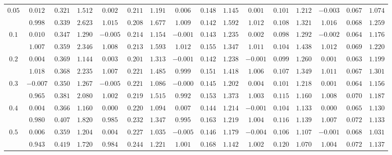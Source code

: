 \begin{table}
\begin{center}
\begin{tabular}{|c|ccc|ccc|ccc|ccc|ccc|}
\hline 
$0.05$ & $ 0.012 $ & $ 0.321 $ & $ 1.512 $ & $ 0.002 $ & $ 0.211 $ & $ 1.191 $ & $ 0.006 $ & $ 0.148 $ & $ 1.145 $ & $ 0.001 $ & $ 0.101 $ & $ 1.212 $ & $ -0.003 $ & $ 0.067 $ & $ 1.074 $\\ 
 & $ 0.998 $ & $ 0.339 $ & $ 2.623 $ & $ 1.015 $ & $ 0.208 $ & $ 1.677 $ & $ 1.009 $ & $ 0.142 $ & $ 1.592 $ & $ 1.012 $ & $ 0.108 $ & $ 1.321 $ & $ 1.016 $ & $ 0.068 $ & $ 1.259 $\\ 
\hline 
$0.1$ & $ 0.010 $ & $ 0.347 $ & $ 1.290 $ & $ -0.005 $ & $ 0.214 $ & $ 1.154 $ & $ -0.001 $ & $ 0.143 $ & $ 1.235 $ & $ 0.002 $ & $ 0.098 $ & $ 1.292 $ & $ -0.002 $ & $ 0.064 $ & $ 1.176 $\\ 
 & $ 1.007 $ & $ 0.359 $ & $ 2.346 $ & $ 1.008 $ & $ 0.213 $ & $ 1.593 $ & $ 1.012 $ & $ 0.155 $ & $ 1.347 $ & $ 1.011 $ & $ 0.104 $ & $ 1.438 $ & $ 1.012 $ & $ 0.069 $ & $ 1.220 $\\ 
\hline 
$0.2$ & $ 0.004 $ & $ 0.369 $ & $ 1.144 $ & $ 0.003 $ & $ 0.201 $ & $ 1.313 $ & $ -0.001 $ & $ 0.142 $ & $ 1.238 $ & $ -0.001 $ & $ 0.099 $ & $ 1.260 $ & $ 0.001 $ & $ 0.063 $ & $ 1.199 $\\ 
 & $ 1.018 $ & $ 0.368 $ & $ 2.235 $ & $ 1.007 $ & $ 0.221 $ & $ 1.485 $ & $ 0.999 $ & $ 0.151 $ & $ 1.418 $ & $ 1.006 $ & $ 0.107 $ & $ 1.349 $ & $ 1.011 $ & $ 0.067 $ & $ 1.301 $\\ 
\hline 
$0.3$ & $ -0.007 $ & $ 0.350 $ & $ 1.267 $ & $ -0.005 $ & $ 0.221 $ & $ 1.086 $ & $ -0.000 $ & $ 0.145 $ & $ 1.202 $ & $ 0.004 $ & $ 0.101 $ & $ 1.218 $ & $ 0.001 $ & $ 0.064 $ & $ 1.156 $\\ 
 & $ 0.965 $ & $ 0.381 $ & $ 2.080 $ & $ 1.002 $ & $ 0.219 $ & $ 1.515 $ & $ 0.992 $ & $ 0.153 $ & $ 1.373 $ & $ 1.003 $ & $ 0.115 $ & $ 1.160 $ & $ 1.008 $ & $ 0.070 $ & $ 1.187 $\\ 
\hline 
$0.4$ & $ 0.004 $ & $ 0.366 $ & $ 1.160 $ & $ 0.000 $ & $ 0.220 $ & $ 1.094 $ & $ 0.007 $ & $ 0.144 $ & $ 1.214 $ & $ -0.001 $ & $ 0.104 $ & $ 1.133 $ & $ 0.000 $ & $ 0.065 $ & $ 1.130 $\\ 
 & $ 0.980 $ & $ 0.407 $ & $ 1.820 $ & $ 0.985 $ & $ 0.232 $ & $ 1.347 $ & $ 0.995 $ & $ 0.163 $ & $ 1.219 $ & $ 1.004 $ & $ 0.116 $ & $ 1.139 $ & $ 1.007 $ & $ 0.072 $ & $ 1.133 $\\ 
\hline 
$0.5$ & $ 0.006 $ & $ 0.359 $ & $ 1.204 $ & $ 0.004 $ & $ 0.227 $ & $ 1.035 $ & $ -0.005 $ & $ 0.146 $ & $ 1.179 $ & $ -0.004 $ & $ 0.106 $ & $ 1.107 $ & $ -0.001 $ & $ 0.068 $ & $ 1.031 $\\ 
 & $ 0.943 $ & $ 0.419 $ & $ 1.720 $ & $ 0.984 $ & $ 0.244 $ & $ 1.221 $ & $ 1.001 $ & $ 0.168 $ & $ 1.142 $ & $ 1.002 $ & $ 0.120 $ & $ 1.070 $ & $ 1.004 $ & $ 0.072 $ & $ 1.137 $\\ 

\end{tabular}
\end{center}
\end{table}
